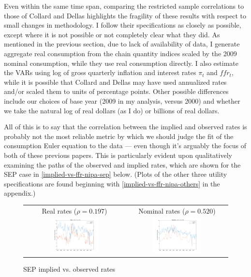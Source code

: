 Even within the same time span, comparing the restricted sample correlations to those of Collard and Dellas highlights the fragility of these results with respect to small changes in methodology. I follow their specifications as closely as possible, except where it is not possible or not completely clear what they did. As mentioned in the previous section, due to lack of availability of data, I generate aggregate real consumption from the chain quantity indices scaled by the 2009 nominal consumption, while they use real consumption directly. I also estimate the VARs using log of gross quarterly inflation and interest rates $\pi_t$ and $ffr_t$, while it is possible that Collard and Dellas may have used annualized rates and/or scaled them to units of percentage points. Other possible differences include our choices of base year (2009 in my analysis, versus 2000) and whether we take the natural log of real dollars (as I do) or billions of real dollars.

All of this is to say that the correlation between the implied and observed rates is probably not the most reliable metric by which we should judge the fit of the consumption Euler equation to the data --- even though it's arguably the focus of both of these previous papers. This is particularly evident upon qualitatively examining the paths of the observed and implied rates, which are shown for the SEP case in \autoref{implied-vs-ffr-nipa-sep} below. (Plots of the other three utility specifications are found beginning with \autoref{implied-vs-ffr-nipa-others} in the appendix.)

\begin{figure}[h]
\centering
\begin{tabular}{cc} \\
Real rates ($\rho = 0.197$) & Nominal rates ($\rho = 0.520$) \\
\includegraphics[width=0.49\textwidth]{figs/nipa/implied-vs-ffr/real_sep} &
\includegraphics[width=0.49\textwidth]{figs/nipa/implied-vs-ffr/nominal_sep}
\end{tabular}
\caption{SEP implied vs. observed rates}
\label{implied-vs-ffr-nipa-sep}
\end{figure}

